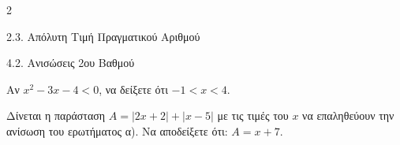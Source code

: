 \begin{ylh}{2}
    \item 2.3. Απόλυτη Τιμή Πραγματικού Αριθμού
    \item 4.2. Ανισώσεις 2ου Βαθμού
\end{ylh}

\begin{alist}
\item Αν $x^{2} - 3x - 4 < 0$, να δείξετε ότι $- 1 < x < 4$.
\item Δίνεται η παράσταση $A = |2x + 2| + |x - 5|$ με τις τιμές του $x$ να επαληθεύουν την ανίσωση του ερωτήματος α). Να αποδείξετε ότι: $A = x + 7$.
\end{alist}

